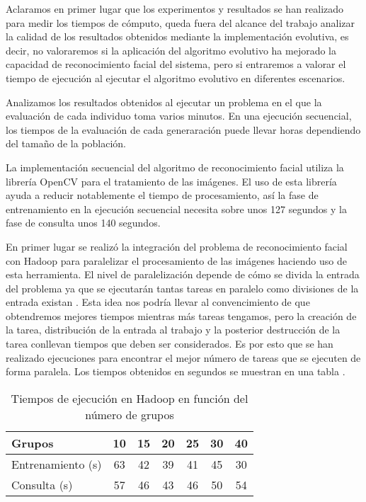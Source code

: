 \label{resultados-facerecognition}

Aclaramos en primer lugar que los experimentos y resultados se han realizado para medir los tiempos de cómputo, queda fuera del alcance del trabajo analizar la calidad de los resultados obtenidos mediante la implementación evolutiva, es decir, no valoraremos si la aplicaci\'on del algoritmo evolutivo ha mejorado la capacidad de reconocimiento facial del sistema, pero si entraremos a valorar el tiempo de ejecuci\'on al ejecutar el algoritmo evolutivo en diferentes escenarios.

Analizamos los resultados obtenidos al ejecutar un problema en el que la evaluación de cada individuo toma varios minutos. En una ejecuci\'on secuencial, los tiempos de la evaluación de cada generaraci\'on puede llevar horas dependiendo del tamaño de la población.

La implementaci\'on secuencial del algoritmo de reconocimiento facial utiliza la librer\'ia OpenCV para el tratamiento de las im\'agenes. El uso de esta librer\'ia ayuda a reducir notablemente el tiempo de procesamiento, as\'i la fase de entrenamiento en la ejecuci\'on secuencial necesita sobre unos 127 segundos y la fase de consulta unos 140 segundos. 

En primer lugar se realiz\'o la integraci\'on del problema de reconocimiento facial con Hadoop para paralelizar el procesamiento de las im\'agenes haciendo uso de esta herramienta. El nivel de paralelizaci\'on depende de c\'omo se divida la entrada del problema ya que se ejecutar\'an tantas tareas en paralelo como divisiones de la entrada existan . Esta idea nos podr\'ia llevar al convencimiento de que obtendremos mejores tiempos mientras m\'as tareas tengamos, pero la creaci\'on de la tarea, distribuci\'on de la entrada al trabajo y la posterior destrucci\'on de la tarea conllevan tiempos que deben ser considerados. Es por esto que se han realizado ejecuciones para encontrar el mejor n\'umero de tareas que se ejecuten de forma paralela. Los tiempos obtenidos en segundos se muestran en una tabla .

\begin{table}[H]
  \begin{center}
    \begin{center}
    \begin{tabular}{l | c c c c c c}
    Grupos & 10 & 15 & 20 & 25 & 30 & 40 \\ \hline
    Entrenamiento (s) & 63 & 42 & 39 & 41 & 45 & 30\\
    Consulta (s) & 57 & 46 & 43 & 46 & 50 & 54\\
    \end{tabular}
    \end{center}
    \caption{Tiempos de ejecución en Hadoop en funci\'on del n\'umero de grupos}
    \label{tabla-tiempos-num-grupos}
  \end{center}
\end{table}

